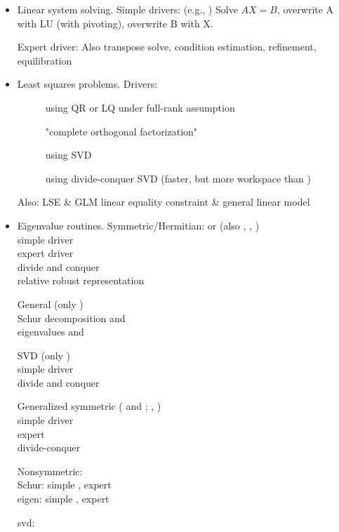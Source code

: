 \begin{itemize}
\item Linear system solving.
Simple drivers:  (e.g., ) 
Solve $AX=B$, overwrite A with LU (with pivoting),
overwrite B with X.

Expert driver: 
Also transpose solve, condition estimation, refinement, equilibration
\item Least squares problems.
Drivers: 
\begin{description}
\item[] using QR or LQ under full-rank assumption
\item[] "complete orthogonal factorization"
\item[] using SVD
\item[] using divide-conquer SVD
(faster, but more workspace than )
\end{description}

Also: LSE \& GLM linear equality constraint \& general linear model

\item Eigenvalue routines.
Symmetric/Hermitian:  or  (also , , )\\
simple driver \\
expert driver \\
divide and conquer \\
relative robust representation 

General (only )\\
Schur decomposition  and \\
eigenvalues  and 

SVD (only )\\
simple driver \\
divide and conquer 

Generalized symmetric ( and ; , )\\
simple driver \\
expert \\
divide-conquer 

Nonsymmetric:\\
Schur: simple , expert \\
eigen: simple , expert 

svd: 

\end{itemize}

